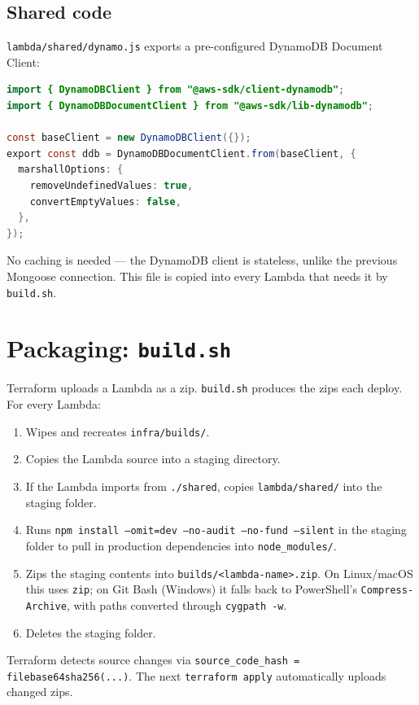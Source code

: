 \documentclass[11pt,a4paper]{article}
\begin{document}
\subsection{Shared code}
\texttt{lambda/shared/dynamo.js} exports a pre-configured DynamoDB Document Client:
\begin{lstlisting}[language=java]
import { DynamoDBClient } from "@aws-sdk/client-dynamodb";
import { DynamoDBDocumentClient } from "@aws-sdk/lib-dynamodb";

const baseClient = new DynamoDBClient({});
export const ddb = DynamoDBDocumentClient.from(baseClient, {
  marshallOptions: {
    removeUndefinedValues: true,
    convertEmptyValues: false,
  },
});
\end{lstlisting}
No caching is needed --- the DynamoDB client is stateless, unlike the previous Mongoose connection. This file is copied into every Lambda that needs it by \texttt{build.sh}.

\section{Packaging: \texttt{build.sh}}

Terraform uploads a Lambda as a zip. \texttt{build.sh} produces the zips each deploy. For every Lambda:

\begin{enumerate}[leftmargin=*]
  \item Wipes and recreates \texttt{infra/builds/}.
  \item Copies the Lambda source into a staging directory.
  \item If the Lambda imports from \texttt{./shared}, copies \texttt{lambda/shared/} into the staging folder.
  \item Runs \texttt{npm install --omit=dev --no-audit --no-fund --silent} in the staging folder to pull in production dependencies into \texttt{node\_modules/}.
  \item Zips the staging contents into \texttt{builds/<lambda-name>.zip}. On Linux/macOS this uses \texttt{zip}; on Git Bash (Windows) it falls back to PowerShell's \texttt{Compress-Archive}, with paths converted through \texttt{cygpath -w}.
  \item Deletes the staging folder.
\end{enumerate}

Terraform detects source changes via \texttt{source\_code\_hash = filebase64sha256(...)}. The next \texttt{terraform apply} automatically uploads changed zips.
\end{document}
